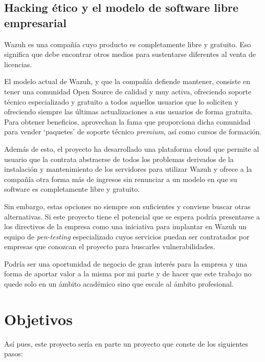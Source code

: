 \subsection{Hacking ético y el modelo de software libre empresarial}

Wazuh es una compañía cuyo producto es completamente libre y gratuito. Eso significa que debe encontrar otros medios para sustentarse diferentes al venta de licencias.

El modelo actual de Wazuh, y que la compañía defiende mantener, consiste en tener una comunidad Open Source de calidad y muy activa, ofreciendo soporte técnico especializado y gratuito a todos aquellos usuarios que lo soliciten y ofreciendo siempre las últimas actualizaciones a sus usuarios de forma gratuita. Para obtener beneficios, aprovechan la fama que proporciona dicha comunidad para vender `paquetes' de soporte técnico \textit{premium}, así como cursos de formación.

Además de esto, el proyecto ha desarrollado una plataforma \gls{cloud} que permite al usuario que la contrata abstraerse de todos los problemas derivados de la instalación y mantenimiento de los servidores para utilizar Wazuh y ofrece a la compañía otra forma más de ingresos sin renunciar a un modelo en que su software es completamente libre y gratuito.

Sin embargo, estas opciones no siempre son suficientes y conviene buscar otras alternativas. Si este proyecto tiene el potencial que se espera podría presentarse a los directivos de la empresa como una iniciativa para implantar en Wazuh un equipo de \textit{pen-testing} especializado cuyos servicios puedan ser contratados por empresas que conozcan el proyecto para buscarles vulnerabilidades.

Podría ser una oportunidad de negocio de gran interés para la empresa y una forma de aportar valor a la misma por mi parte y de hacer que este trabajo no quede solo en un ámbito académico sino que escale al ámbito profesional.


\section{Objetivos}

Así pues, este proyecto sería en parte un proyecto que conste de los siguientes pasos:

